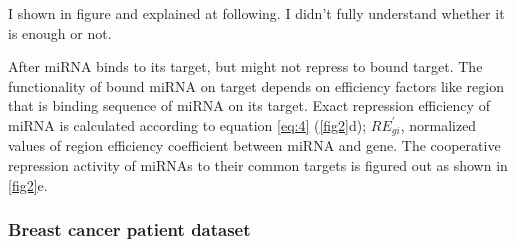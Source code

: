 \documentclass[a4,center,fleqn]{NAR}
\begin{document}

I shown in figure and explained at following. I didn't fully understand
whether it is enough or not.

After miRNA binds to its target, but might not repress to bound target.
The functionality of bound miRNA on target depends on efficiency factors
like region that is binding sequence of miRNA on its target. Exact
repression efficiency of miRNA is calculated according to equation
\eqref{eq:4} (\autoref{fig2}d); \(RE^\prime_{gi}\), normalized values of
region efficiency coefficient between miRNA and gene. The cooperative
repression activity of miRNAs to their common targets is figured out as
shown in \autoref{fig2}e.

\hypertarget{breast-cancer-patient-dataset}{%
\subsubsection{Breast cancer patient
dataset}\label{breast-cancer-patient-dataset}}
\end{document}
